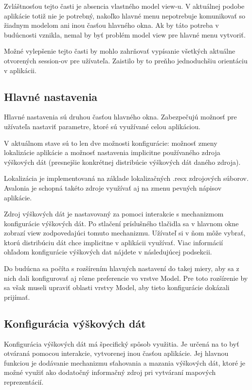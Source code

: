 Zvláštnosťou tejto časti je absencia vlastného model view-u. V aktuálnej podobe aplikácie totiž nie je potrebný, nakoľko hlavné menu nepotrebuje komunikovať so žiadnym modelom ani inou časťou hlavného okna. Ak by táto potreba v budúcnosti vznikla, nemal by byť problém model view pre hlavné menu vytvoriť. 

Možné vylepšenie tejto časti by mohlo zahrňovať vypísanie všetkých aktuálne otvorených session-ov pre užívateľa. Zaistilo by to preňho jednoduchšiu orientáciu v aplikácii.

\subsection{Hlavné nastavenia}

Hlavné nastavenia sú druhou časťou hlavného okna. Zabezpečujú možnosť pre užívateľa nastaviť parametre, ktoré sú využívané celou aplikáciou. 

V aktuálnom stave sú to len dve možnosti konfigurácie: možnosť zmeny lokalizácie aplikácie a možnosť nastavenia implicitne používaného zdroja výškových dát (presnejšie konkrétnej distribúcie výškových dát daného zdroja). 

Lokalizácia je implementovaná na základe lokalizačných .resx zdrojových súborov. Avalonia je schopná takéto zdroje využívať aj na zmenu pevných nápisov aplikácie. %

Zdroj výškových dát je nastavovaný za pomoci interakcie s mechanizmom konfigurácie výškových dát. Po stlačení príslušného tlačidla sa v hlavnom okne zobrazí view zodpovedajúci tomuto mechanizmu. Užívateľ si v ňom môže vybrať, ktorú distribúciu dát chce implicitne v aplikácii využívať. Viac informácií ohľadom konfigurácie výškových dat nájdete v následujúcej podsekcii.

Do budúcna sa počíta s rozšírením hlavných nastavení do takej miery, aby sa z nich dali konfigurovať aj rôzne preferencie vo vrstve Model. Pre toto rozšírenie by sa však museli upraviť oblasti vrstvy Model, aby tieto konfigurácie dokázali prijímať.

\subsection{Konfigurácia výškových dát}\label{konfiguracia_vyskovych_dat}

Konfigurácia výškových dát má špecifický spôsob využitia. Je určená na to byť otváraná pomocou interakcie, vytvorenej inou časťou aplikácie. Jej hlavnou funkciou je dodávanie mechanizmu sťahovania a mazania výškových dát, ktoré je možné využiť ako dodatočný informačný zdroj pri vytváraní mapových reprezentácií. 

